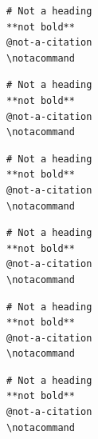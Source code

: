 \begin{verbatim}
# Not a heading
**not bold**
@not-a-citation
\notacommand
\end{verbatim}
\begin{verbatim}
# Not a heading
**not bold**
@not-a-citation
\notacommand
\end{verbatim}
\begin{verbatim}
# Not a heading
**not bold**
@not-a-citation
\notacommand
\end{verbatim}
\begin{frame}[t,fragile]
\begin{verbatim}
# Not a heading
**not bold**
@not-a-citation
\notacommand
\end{verbatim}
\end{frame}

\begin{frame}[t,fragile]
\begin{verbatim}
# Not a heading
**not bold**
@not-a-citation
\notacommand
\end{verbatim}
\end{frame}

\begin{frame}[t,fragile]
\begin{verbatim}
# Not a heading
**not bold**
@not-a-citation
\notacommand
\end{verbatim}
\end{frame}


